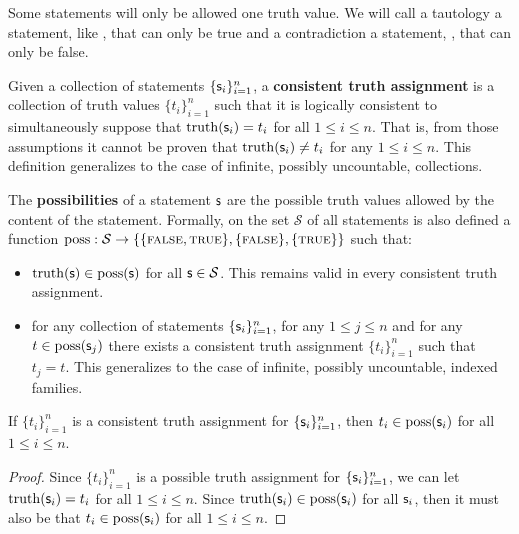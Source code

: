 \documentclass[11pt,letterpaper,fleqn]{memoir} %
\begin{document}
Some statements will only be allowed one truth value. We will call a tautology a statement, like , that can only be true and a contradiction a statement, , that can only be false.

\begin{mathSection}
	\begin{defn}
	Given a collection of statements $\{\mathsf{s}_i\}^n_{i=1}$, a \textbf{consistent truth assignment} is a collection of truth values $\{t_i\}^n_{i=1}$ such that it is logically consistent to simultaneously suppose that $\operatorname{truth}(\mathsf{s}_i) = t_i$ for all $1 \leq i \leq n$. That is, from those assumptions it cannot be proven that $\operatorname{truth}(\mathsf{s}_i) \neq t_i$ for any $1 \leq i \leq n$.  This definition generalizes to the case of infinite, possibly uncountable, collections.
\end{defn}
	
\begin{axiom}\label{ax_possibilities}
	The \textbf{possibilities} of a statement $\mathsf{s}$ are the possible truth values allowed by the content of the statement. Formally, on the set $\mathcal{S}$ of all statements is also defined a function $\operatorname{poss}: \mathcal{S} \to \{\{\textsc{false}, \textsc{true}\},\{\textsc{false}\},\{\textsc{true}\}\}$ such that:
	\begin{itemize}
		\item $\operatorname{truth}(\mathsf{s}) \in \operatorname{poss}(\mathsf{s})$ for all $\mathsf{s} \in \mathcal{S}$. This remains valid in every consistent truth assignment.
		\item for any collection of statements $\{\mathsf{s}_i\}^n_{i=1}$, for any $1 \leq j \leq n$ and for any $t \in \operatorname{poss}(\mathsf{s}_j)$ there exists a consistent truth assignment $\{t_i\}^n_{i=1}$ such that $t_j = t$. This generalizes to the case of infinite, possibly uncountable, indexed families.
	\end{itemize}
\end{axiom}

\begin{coro}
	If $\{t_i\}^n_{i=1}$ is a consistent truth assignment for $\{\mathsf{s}_i\}^n_{i=1}$, then $t_i \in \operatorname{poss}(\mathsf{s}_i)$ for all $1 \leq i \leq n$.
\end{coro}
\begin{proof}
	Since $\{t_i\}^n_{i=1}$ is a possible truth assignment for $\{\mathsf{s}_i\}^n_{i=1}$, we can let $\operatorname{truth}(\mathsf{s}_i) = t_i$ for all $1 \leq i \leq n$. Since $\operatorname{truth}(\mathsf{s}_i) \in \operatorname{poss}(\mathsf{s}_i)$ for all $\mathsf{s}_i$, then it must also be that $t_i \in \operatorname{poss}(\mathsf{s}_i)$ for all $1 \leq i \leq n$.
\end{proof}


\end{mathSection}
\end{document}
